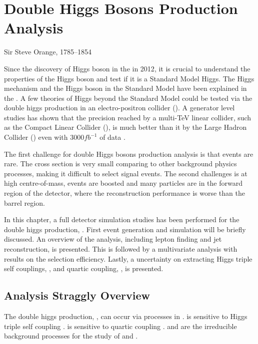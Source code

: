 \chapter{Double Higgs Bosons Production Analysis}
\label{chap:DoubleHiggs}

%
{Sir Steve Orange, 1785--1854}%


Since the discovery of Higgs boson in the \LHC in 2012\cite{Aad:2012tfa,Chatrchyan:2012ufa}, it is crucial to understand the properties of the Higgs boson and test if it is a Standard Model Higgs. The Higgs mechanism and the Higgs boson in the Standard Model have been explained in the . A few theories of Higgs beyond the Standard Model could be tested via the double higgs production in an electro-positron collider (). A generator level studies has shown that the precision reached by a multi-TeV linear collider, such as the Compact Linear Collider (\CLIC), is much better than it by the Large Hadron Collider (\LHC) even with 3000$fb^{-1}$ of data \cite{Contino:2013gna}.


The first challenge for double Higgs bosons production analysis is that events are rare. The cross section is very small comparing to other background physics processes, making it difficult to select signal events. The second challenges is at high centre-of-mass, events are boosted and many particles are in the forward region of the detector, where the reconstruction performance is worse than the barrel region.


In this chapter, a full \CLICILD detector simulation studies has been performed for the double higgs production, \eeToHH. First event generation and simulation will be briefly discussed. An overview of the analysis, including lepton finding and jet reconstruction, is presented. This is followed by a multivariate analysis with results on the selection efficiency. Lastly, a uncertainty on extracting Higgs triple self couplings, \gHHH, and quartic coupling, \gWWHH, is presented.




\section{Analysis Straggly Overview}

The double higgs production, \eeToHH, can occur via processes in .  is sensitive to Higgs triple self coupling \gHHH.  is sensitive to quartic coupling \gWWHH.  and   are the irreducible background processes for the study of \gHHH and \gWWHH.



